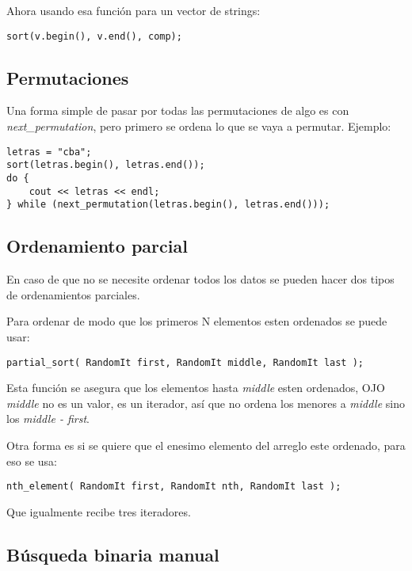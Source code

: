\documentclass[10pt]{article}
\begin{document}
Ahora usando esa función para un vector de strings:

\begin{lstlisting}
sort(v.begin(), v.end(), comp);
\end{lstlisting}

\subsection{Permutaciones}

Una forma simple de pasar por todas las permutaciones de algo es con \textit{next\_permutation}, pero primero se ordena lo que se vaya a permutar. Ejemplo:

\begin{lstlisting}
letras = "cba";
sort(letras.begin(), letras.end());
do {
    cout << letras << endl;
} while (next_permutation(letras.begin(), letras.end()));
\end{lstlisting}

\subsection{Ordenamiento parcial}

En caso de que no se necesite ordenar todos los datos se pueden hacer dos tipos de ordenamientos parciales.

Para ordenar de modo que los primeros N elementos esten ordenados se puede usar:

\begin{lstlisting}
partial_sort( RandomIt first, RandomIt middle, RandomIt last );
\end{lstlisting}

Esta función se asegura que los elementos hasta \textit{middle} esten ordenados, OJO \textit{middle} no es un valor, es un iterador, así que no ordena los menores a \textit{middle} sino los \textit{middle - first}.

Otra forma es si se quiere que el enesimo elemento del arreglo este ordenado, para eso se usa:

\begin{lstlisting}
nth_element( RandomIt first, RandomIt nth, RandomIt last );
\end{lstlisting}

Que igualmente recibe tres iteradores.

\subsection{Búsqueda binaria manual}
\end{document}
